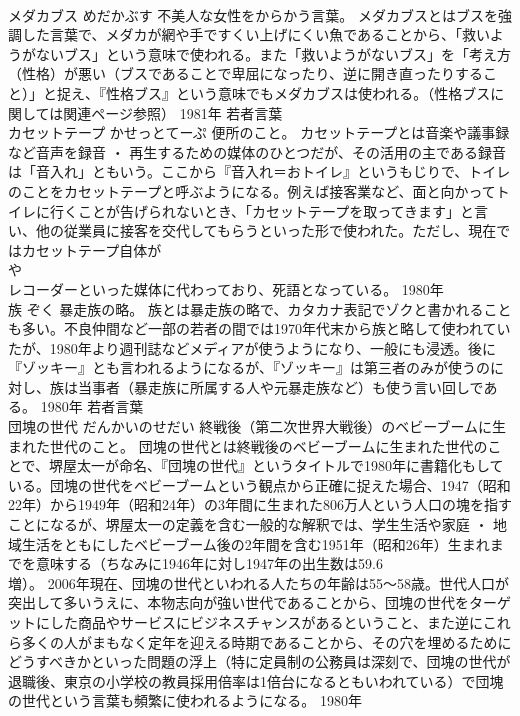 \documentclass[8pt]{extreport}
\begin{document}
\begin{CJK}{UTF8}{min}
\\	メダカブス	めだかぶす	不美人な女性をからかう言葉。	メダカブスとはブスを強調した言葉で、メダカが網や手ですくい上げにくい魚であることから、「救いようがないブス」という意味で使われる。また「救いようがないブス」を「考え方（性格）が悪い（ブスであることで卑屈になったり、逆に開き直ったりすること）」と捉え、『性格ブス』という意味でもメダカブスは使われる。（性格ブスに関しては関連ページ参照）	1981年	若者言葉	
\\	カセットテープ	かせっとてーぷ	便所のこと。	カセットテープとは音楽や議事録など音声を録音 ・ 再生するための媒体のひとつだが、その活用の主である録音は「音入れ」ともいう。ここから『音入れ＝おトイレ』というもじりで、トイレのことをカセットテープと呼ぶようになる。例えば接客業など、面と向かってトイレに行くことが告げられないとき、「カセットテープを取ってきます」と言い、他の従業員に接客を交代してもらうといった形で使われた。ただし、現在ではカセットテープ自体が
\\	や
\\	レコーダーといった媒体に代わっており、死語となっている。	1980年	
\\	族	ぞく	暴走族の略。	族とは暴走族の略で、カタカナ表記でゾクと書かれることも多い。不良仲間など一部の若者の間では1970年代末から族と略して使われていたが、1980年より週刊誌などメディアが使うようになり、一般にも浸透。後に『ゾッキー』とも言われるようになるが、『ゾッキー』は第三者のみが使うのに対し、族は当事者（暴走族に所属する人や元暴走族など）も使う言い回しである。	1980年	若者言葉	
\\	団塊の世代	だんかいのせだい	終戦後（第二次世界大戦後）のベビーブームに生まれた世代のこと。	団塊の世代とは終戦後のベビーブームに生まれた世代のことで、堺屋太一が命名、『団塊の世代』というタイトルで1980年に書籍化もしている。団塊の世代をベビーブームという観点から正確に捉えた場合、1947（昭和22年）から1949年（昭和24年）の3年間に生まれた806万人という人口の塊を指すことになるが、堺屋太一の定義を含む一般的な解釈では、学生生活や家庭 ・ 地域生活をともにしたベビーブーム後の2年間を含む1951年（昭和26年）生まれまでを意味する（ちなみに1946年に対し1947年の出生数は59.6
\\	増）。 2006年現在、団塊の世代といわれる人たちの年齢は55～58歳。世代人口が突出して多いうえに、本物志向が強い世代であることから、団塊の世代をターゲットにした商品やサービスにビジネスチャンスがあるということ、また逆にこれら多くの人がまもなく定年を迎える時期であることから、その穴を埋めるためにどうすべきかといった問題の浮上（特に定員制の公務員は深刻で、団塊の世代が退職後、東京の小学校の教員採用倍率は1倍台になるともいわれている）で団塊の世代という言葉も頻繁に使われるようになる。	1980年	

\end{CJK}
\end{document}
